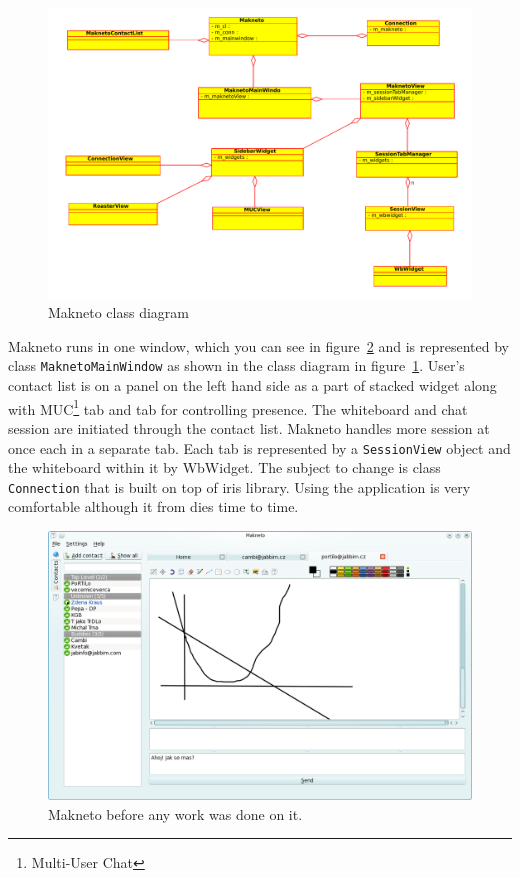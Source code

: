 \begin{figure}[ht]
\begin{center}
	\includegraphics[width=15cm]{fig/makneto-orig-class-diagram.pdf}
	\caption{Makneto class diagram}
	\label{fig:makneto-original-class-diagram}
\end{center}
\end{figure}

Makneto runs in one window, which you can see in figure~\ref{fig:makneto-original} and is represented by class \verb|MaknetoMainWindow| as shown in the class diagram in figure~\ref{fig:makneto-original-class-diagram}. User's contact list is on a panel on the left hand side as a part of stacked widget along with MUC\footnote{Multi-User Chat} tab and tab for controlling presence. The whiteboard and chat session are initiated through the contact list. Makneto handles more session at once each in a separate tab. Each tab is represented by a \verb|SessionView| object and the whiteboard within it by WbWidget. The subject to change is class \verb|Connection| that is built on top of iris library. Using the application is very comfortable although it from dies time to time.


\begin{figure}[ht]
\begin{center}
	\includegraphics[width=15cm]{fig/makneto-original.png}
	\caption{Makneto before any work was done on it.}
	\label{fig:makneto-original}
\end{center}
\end{figure}


